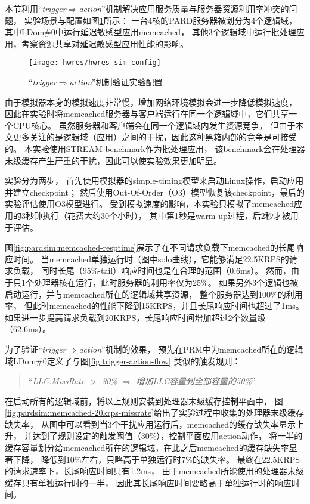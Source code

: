 本节利用``\emph{trigger$\Rightarrow$action}''机制解决应用服务质量与服务器资源利用率冲突的问题，
实验场景与配置如图\ref{fig:hwres-sim-config}所示：
一台4核的PARD服务器被划分为4个逻辑域，其中LDom\#0中运行延迟敏感型应用memcached，
其他3个逻辑域中运行批处理应用，考察资源共享对延迟敏感型应用性能的影响。

\begin{figure}[tb]
  \centering
  \texttt{[image: hwres/hwres-sim-config]}
  \caption{``\emph{trigger$\Rightarrow$action}''机制验证实验配置}
  \label{fig:hwres-sim-config}
\end{figure}

由于模拟器本身的模拟速度非常慢，增加网络环境模拟会进一步降低模拟速度，
因此在实验时将memcached服务器与客户端运行在同一个逻辑域中，它们共享一个CPU核心。
虽然服务器和客户端会在同一个逻辑域内发生资源竞争，
但由于本文更多关注的是逻辑域（应用）之间的干扰，因此这种黑箱内部的竞争是可接受的。
本实验使用STREAM benchmark\cite{stream}作为批处理应用，
该benchmark会在处理器末级缓存产生严重的干扰，因此可以使实验效果更加明显。

实验分为两步，
首先使用模拟器的simple-timing模型来启动Linux操作，启动应用并建立checkpoint；
然后使用Out-Of-Order（O3）模型恢复该checkpoint，最后的实验评估使用O3模型进行。
受到模拟速度的影响，本实验只模拟了memcached应用的3秒钟执行（花费大约30个小时），
其中第1秒是warm-up过程，后2秒才被用于评估。

图\ref{fig:pardsim:memcached-resptime}展示了在不同请求负载下memcached的长尾响应时间。
当memcached单独运行时（图中solo曲线），它能够满足22.5KRPS的请求负载，
同时长尾（95\%-tail）响应时间也是在合理的范围（0.6ms）。
然而，由于只1个处理器核在运行，此时服务器的利用率仅为25\%。
如果另外3个逻辑也被启动运行，并与memcached所在的逻辑域共享资源，
整个服务器达到100\%的利用率，
但此时memcached的性能下降到15KRPS，并且长尾响应时间也超过了1ms。
如果进一步提高请求负载到20KRPS，长尾响应时间增加超过2个数量级（62.6ms）。

为了验证``\emph{trigger$\Rightarrow$action}''机制的效果，
预先在PRM中为memcached所在的逻辑域LDom\#0定义了与图\ref{fig:trigger-action-flow}
类似的触发规则：
\begin{verse}
``\emph{LLC.MissRate $>$ 30\% $\Rightarrow$ 增加LLC容量到全部容量的50\%}''
\end{verse}

在启动所有的逻辑域前，将以上规则安装到处理器末级缓存控制平面中，
图\ref{fig:pardsim:memcached-20krps-missrate}给出了实验过程中收集的处理器末级缓存缺失率，
从图中可以看到当3个干扰应用运行后，memcached的缓存缺失率显示上升，
并达到了规则设定的触发阈值（30\%），控制平面应用action动作，
将一半的缓存容量划分给memcached所在的逻辑域，在此之后memcached的缓存缺失率显著下降，
降低到10\%左右，只略高于单独运行时7\%的缺失率。
最终在22.5KRPS的请求速率下，长尾响应时间只有1.2ms，
由于memcached所能使用的处理器末级缓存只有单独运行时的一半，
因此其长尾响应时间要略高于单独运行时的响应时间。

